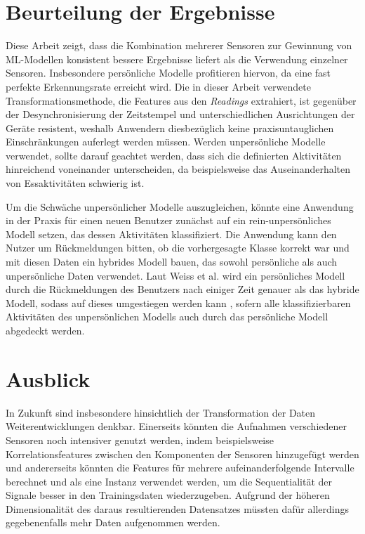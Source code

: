 \section{Beurteilung der Ergebnisse}
Diese Arbeit zeigt, dass die Kombination mehrerer Sensoren zur Gewinnung von \acs{ML}-Modellen konsistent bessere Ergebnisse liefert als die Verwendung einzelner Sensoren. Insbesondere persönliche Modelle profitieren hiervon, da eine fast perfekte Erkennungsrate erreicht wird. Die in dieser Arbeit verwendete Transformationsmethode, die Features aus den \textit{Readings} extrahiert, ist gegenüber der Desynchronisierung der Zeitstempel und unterschiedlichen Ausrichtungen der Geräte resistent, weshalb Anwendern diesbezüglich keine praxisuntauglichen Einschränkungen auferlegt werden müssen. Werden unpersönliche Modelle verwendet, sollte darauf geachtet werden, dass sich die definierten Aktivitäten hinreichend voneinander unterscheiden, da beispielsweise das Auseinanderhalten von Essaktivitäten schwierig ist.

Um die Schwäche unpersönlicher Modelle auszugleichen, könnte eine Anwendung in der Praxis für einen neuen Benutzer zunächst auf ein rein-unpersönliches Modell setzen, das dessen Aktivitäten klassifiziert. Die Anwendung kann den Nutzer um Rückmeldungen bitten, ob die vorhergesagte Klasse korrekt war und mit diesen Daten ein hybrides Modell bauen, das sowohl persönliche als auch unpersönliche Daten verwendet. Laut Weiss et al. wird ein persönliches Modell durch die Rückmeldungen des Benutzers nach einiger Zeit genauer als das hybride Modell, sodass auf dieses umgestiegen werden kann \cite{Weiss2012}, sofern alle klassifizierbaren Aktivitäten des unpersönlichen Modells auch durch das persönliche Modell abgedeckt werden.

\section{Ausblick}
In Zukunft sind insbesondere hinsichtlich der Transformation der Daten Weiterentwicklungen denkbar. Einerseits könnten die Aufnahmen verschiedener Sensoren noch intensiver genutzt werden, indem beispielsweise Korrelationsfeatures zwischen den Komponenten der Sensoren hinzugefügt werden und andererseits könnten die Features für mehrere aufeinanderfolgende Intervalle berechnet und als eine Instanz verwendet werden, um die Sequentialität der Signale besser in den Trainingsdaten wiederzugeben. Aufgrund der höheren Dimensionalität des daraus resultierenden Datensatzes müssten dafür allerdings gegebenenfalls mehr Daten aufgenommen werden.

